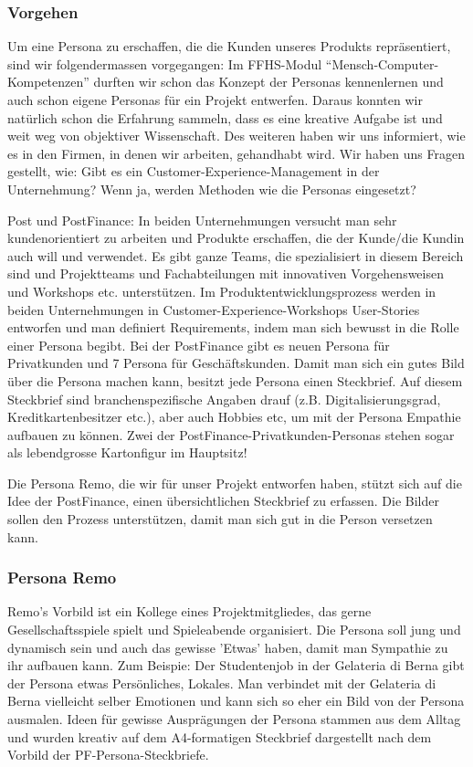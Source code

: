 \subsubsection{Vorgehen}
Um eine Persona zu erschaffen, die die Kunden unseres Produkts repräsentiert, sind wir folgendermassen vorgegangen:
Im FFHS-Modul ``Mensch-Computer-Kompetenzen'' durften wir schon das Konzept der Personas kennenlernen und auch schon eigene Personas für ein Projekt entwerfen. Daraus konnten wir natürlich schon die Erfahrung sammeln, dass es eine kreative Aufgabe ist und weit weg von objektiver Wissenschaft.
Des weiteren haben wir uns informiert, wie es in den Firmen, in denen wir arbeiten, gehandhabt wird. Wir haben uns Fragen gestellt, wie: Gibt es ein Customer-Experience-Management in der Unternehmung? Wenn ja, werden Methoden wie die Personas eingesetzt?

Post und PostFinance:
In beiden Unternehmungen versucht man sehr kundenorientiert zu arbeiten und Produkte erschaffen, die der Kunde/die Kundin auch will und verwendet. Es gibt ganze Teams, die spezialisiert in diesem Bereich sind und Projektteams und Fachabteilungen mit innovativen Vorgehensweisen und Workshops etc. unterstützen. Im Produktentwicklungsprozess werden in beiden Unternehmungen in Customer-Experience-Workshops User-Stories entworfen und man definiert Requirements, indem man sich bewusst in die Rolle einer Persona begibt.
Bei der PostFinance gibt es neuen Persona für Privatkunden und 7 Persona für Geschäftskunden. Damit man sich ein gutes Bild über die Persona machen kann, besitzt jede Persona einen Steckbrief. Auf diesem Steckbrief sind branchenspezifische Angaben drauf (z.B. Digitalisierungsgrad, Kreditkartenbesitzer etc.), aber auch Hobbies etc, um mit der Persona Empathie aufbauen zu können. Zwei der PostFinance-Privatkunden-Personas stehen sogar als lebendgrosse Kartonfigur im Hauptsitz!


Die Persona Remo, die wir für unser Projekt entworfen haben, stützt sich auf die Idee der PostFinance, einen übersichtlichen Steckbrief zu erfassen. Die Bilder sollen den Prozess unterstützen, damit man sich gut in die Person versetzen kann.
\subsubsection{Persona Remo}
Remo's Vorbild ist ein Kollege eines Projektmitgliedes, das gerne Gesellschaftsspiele spielt und Spieleabende organisiert. Die Persona soll jung und dynamisch sein und auch das gewisse 'Etwas' haben, damit man Sympathie zu ihr aufbauen kann. Zum Beispie: Der Studentenjob in der Gelateria di Berna gibt der Persona etwas Persönliches, Lokales. Man verbindet mit der Gelateria di Berna vielleicht selber Emotionen und kann sich so eher ein Bild von der Persona ausmalen.
Ideen für gewisse Ausprägungen der Persona stammen aus dem Alltag und wurden kreativ auf dem A4-formatigen Steckbrief dargestellt nach dem Vorbild der PF-Persona-Steckbriefe.


